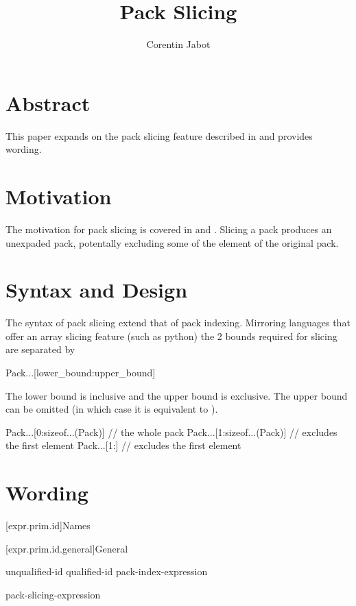 \documentclass{wg21}
\title{Pack Slicing}
\author{Corentin Jabot}{corentin.jabot@gmail.com}
\begin{document}
\maketitle

\section{Abstract}

This paper expands on the pack slicing feature described in  and provides wording.


\section{Motivation}

The motivation for pack slicing is covered in  and .
Slicing a pack produces an unexpaded pack, potentally excluding some of the element of the original pack.


\section{Syntax and Design}

The syntax of pack slicing extend that of pack indexing.
Mirroring languages that offer an array slicing feature (such as python) the 2 bounds required for slicing
are separated by \tcode{:}

\begin{colorblock}
Pack...[lower_bound:upper_bound]
\end{colorblock}

The lower bound is inclusive and the upper bound is exclusive.
The upper bound can be omitted (in which case it is equivalent to ).

\begin{colorblock}
Pack...[0:sizeof...(Pack)] // the whole pack
Pack...[1:sizeof...(Pack)] // excludes the first element
Pack...[1:]                // excludes the first element
\end{colorblock}

\section{Wording}

[expr.prim.id]{Names}

[expr.prim.id.general]{General}

\begin{bnf}
	\br
	unqualified-id\br
	qualified-id\br
    pack-index-expression\br
\begin{addedblock}
    pack-slicing-expression
\end{addedblock}
\end{bnf}
\end{document}
